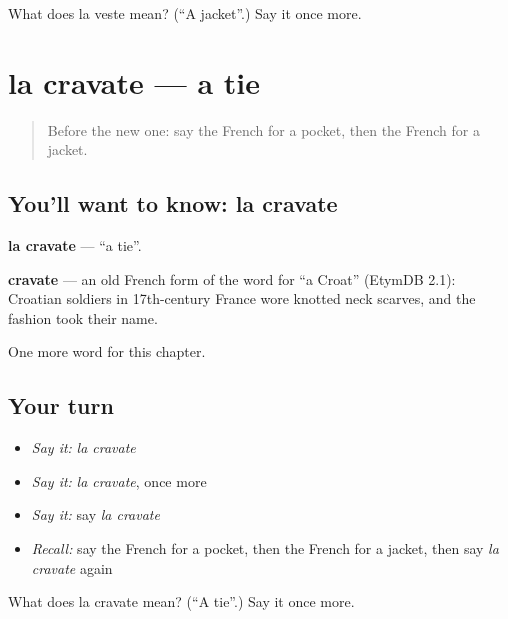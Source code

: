 \begin{tcolorbox}[breakable,colback=teal!4,colframe=teal!35!black,title={Before you move on}]
What does la veste mean? (\textquotedblleft{}A jacket\textquotedblright{}.) Say it once more.
\end{tcolorbox}
\section[la cravate]{la cravate — a tie}

\label{lesson:FR-C116-cravate}



\begin{quote}
Before the new one: say the French for a pocket, then the French for a jacket.
\end{quote}

\subsection*{You'll want to know: la cravate}
\textbf{la cravate} — \textquotedblleft{}a tie\textquotedblright{}.

\begin{cousinweb}
\textbf{cravate} — an old French form of the word for \textquotedblleft{}a Croat\textquotedblright{} (EtymDB 2.1): Croatian soldiers in 17th-century France wore knotted neck scarves, and the fashion took their name.
\end{cousinweb}

\begin{grammarlens}[title={What you've built}]
One more word for this chapter.
\end{grammarlens}

\subsection*{Your turn}
\begin{itemize}
\raggedright
  \item \emph{Say it:} \emph{la cravate}
  \item \emph{Say it:} \emph{la cravate}, once more
  \item \emph{Say it:} say \emph{la cravate}
  \item \emph{Recall:} say the French for a pocket, then the French for a jacket, then say \emph{la cravate} again
\end{itemize}

\begin{tcolorbox}[breakable,colback=teal!4,colframe=teal!35!black,title={Before you move on}]
What does la cravate mean? (\textquotedblleft{}A tie\textquotedblright{}.) Say it once more.
\end{tcolorbox}
